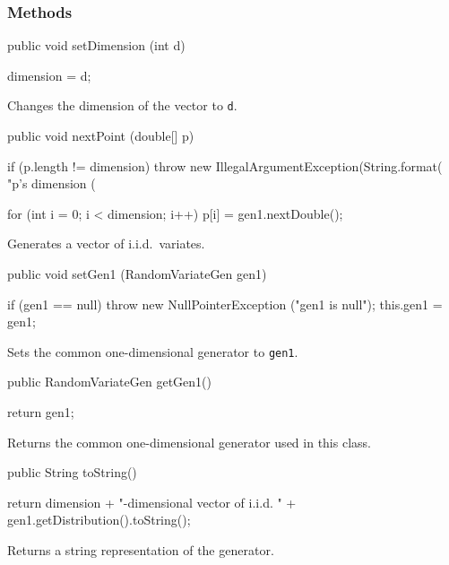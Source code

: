 \subsubsection*{Methods}

\begin{code}

   public void setDimension (int d) \begin{hide} {
      dimension = d;
   } \end{hide}
\end{code}
\begin{tabb}
Changes the dimension of the vector to \texttt{d}.
\end{tabb}
\begin{code}

   public void nextPoint (double[] p) \begin{hide} {
      if (p.length != dimension)
         throw new IllegalArgumentException(String.format(
            "p's dimension (%

      for (int i = 0; i < dimension; i++)
         p[i] = gen1.nextDouble();
   } \end{hide}
\end{code}
\begin{tabb}
Generates a vector of i.i.d.\ variates.
\end{tabb}
\begin{code}

   public void setGen1 (RandomVariateGen gen1)\begin{hide} {
      if (gen1 == null)
         throw new NullPointerException ("gen1 is null");
      this.gen1 = gen1;
   } \end{hide}
\end{code}
\begin{tabb}
Sets the common one-dimensional generator to \texttt{gen1}.
\end{tabb}
\begin{code}

   public RandomVariateGen getGen1()\begin{hide} {
     return gen1;
   } \end{hide}
\end{code}
\begin{tabb}
Returns the common one-dimensional generator used in this class.
\end{tabb}
\begin{code}

   public String toString() \begin{hide} {
      return dimension + "-dimensional vector of i.i.d. " +
            gen1.getDistribution().toString();
   }
   \end{hide}
\end{code}
\begin{tabb}
Returns a string representation of the generator.
\end{tabb}

\begin{code}\begin{hide}
}
\end{hide}\end{code}
